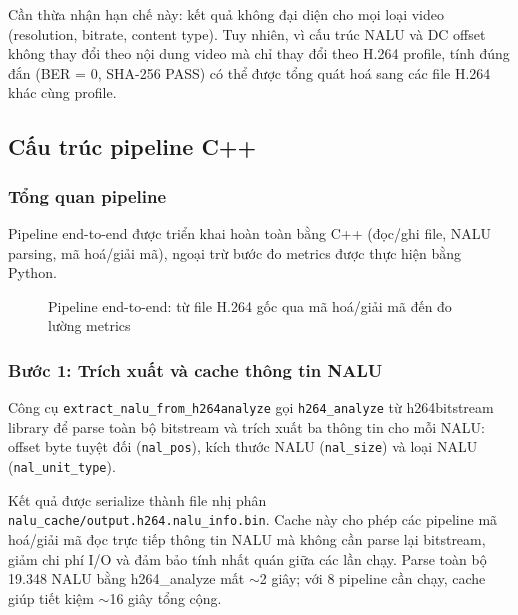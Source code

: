 Cần thừa nhận hạn chế này: kết quả không đại diện cho mọi loại video (resolution, bitrate, content type). Tuy nhiên, vì cấu trúc NALU và DC offset không thay đổi theo nội dung video mà chỉ thay đổi theo H.264 profile, tính đúng đắn (BER = 0, SHA-256 PASS) có thể được tổng quát hoá sang các file H.264 khác cùng profile.

\subsection{Cấu trúc pipeline C++}

\subsubsection{Tổng quan pipeline}

Pipeline end-to-end được triển khai hoàn toàn bằng C++ (đọc/ghi file, NALU parsing, mã hoá/giải mã), ngoại trừ bước đo metrics được thực hiện bằng Python.

\begin{figure}[ht]
\centering

\caption{Pipeline end-to-end: từ file H.264 gốc qua mã hoá/giải mã đến đo lường metrics}
\label{fig:pipeline}
\end{figure}

\subsubsection{Bước 1: Trích xuất và cache thông tin NALU}

Công cụ \texttt{extract\_nalu\_from\_h264analyze} gọi \texttt{h264\_analyze} từ h264bitstream library để parse toàn bộ bitstream và trích xuất ba thông tin cho mỗi NALU: offset byte tuyệt đối (\texttt{nal\_pos}), kích thước NALU (\texttt{nal\_size}) và loại NALU (\texttt{nal\_unit\_type}).

Kết quả được serialize thành file nhị phân \texttt{nalu\_cache/output.h264.nalu\_info.bin}. Cache này cho phép các pipeline mã hoá/giải mã đọc trực tiếp thông tin NALU mà không cần parse lại bitstream, giảm chi phí I/O và đảm bảo tính nhất quán giữa các lần chạy. Parse toàn bộ 19.348 NALU bằng h264\_analyze mất $\sim$2 giây; với 8 pipeline cần chạy, cache giúp tiết kiệm $\sim$16 giây tổng cộng.

